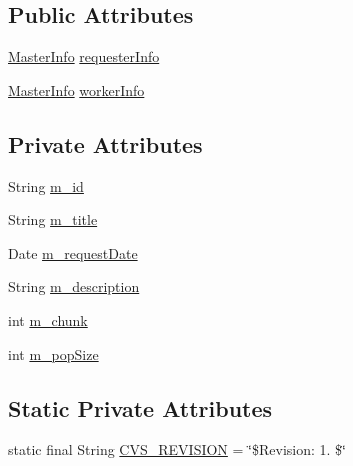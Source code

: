 \subsection*{Public Attributes}
\begin{DoxyCompactItemize}
\item 
\hyperlink{classorg_1_1jgap_1_1distr_1_1_master_info}{Master\-Info} \hyperlink{classorg_1_1jgap_1_1distr_1_1grid_1_1wan_1_1_request_information_a0972ea4c6983634980701f47280e42b3}{requester\-Info}
\item 
\hyperlink{classorg_1_1jgap_1_1distr_1_1_master_info}{Master\-Info} \hyperlink{classorg_1_1jgap_1_1distr_1_1grid_1_1wan_1_1_request_information_aefecadd291c25ada2325331e5100e67b}{worker\-Info}
\end{DoxyCompactItemize}
\subsection*{Private Attributes}
\begin{DoxyCompactItemize}
\item 
String \hyperlink{classorg_1_1jgap_1_1distr_1_1grid_1_1wan_1_1_request_information_ab29bbb5cde83ff185ae2122f9f9a0147}{m\-\_\-id}
\item 
String \hyperlink{classorg_1_1jgap_1_1distr_1_1grid_1_1wan_1_1_request_information_adaeb6dd64202d4e8b593019e4118b928}{m\-\_\-title}
\item 
Date \hyperlink{classorg_1_1jgap_1_1distr_1_1grid_1_1wan_1_1_request_information_ab12b4a78411ad2448c2c0c17ed870c7a}{m\-\_\-request\-Date}
\item 
String \hyperlink{classorg_1_1jgap_1_1distr_1_1grid_1_1wan_1_1_request_information_a4ae87969350016cc47246496481c31c5}{m\-\_\-description}
\item 
int \hyperlink{classorg_1_1jgap_1_1distr_1_1grid_1_1wan_1_1_request_information_a28825b1d55c2c607dc4646e9a8590245}{m\-\_\-chunk}
\item 
int \hyperlink{classorg_1_1jgap_1_1distr_1_1grid_1_1wan_1_1_request_information_ad2eefa8c8dae036e1cf9dfbc0a49912c}{m\-\_\-pop\-Size}
\end{DoxyCompactItemize}
\subsection*{Static Private Attributes}
\begin{DoxyCompactItemize}
\item 
static final String \hyperlink{classorg_1_1jgap_1_1distr_1_1grid_1_1wan_1_1_request_information_ad476144eacd7f463ff279bc74efdcf97}{C\-V\-S\-\_\-\-R\-E\-V\-I\-S\-I\-O\-N} = \char`\"{}\$Revision\-: 1. \$\char`\"{}
\end{DoxyCompactItemize}


